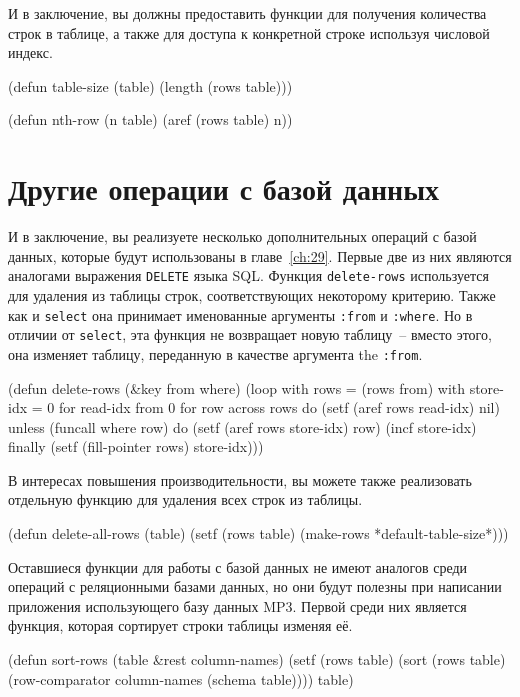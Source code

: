 И в заключение, вы должны предоставить функции для получения количества строк в таблице, а
также для доступа к конкретной строке используя числовой индекс.

\begin{myverb}
(defun table-size (table)
  (length (rows table)))

(defun nth-row (n table)
  (aref (rows table) n))
\end{myverb}

\section{Другие операции с базой данных}

И в заключение, вы реализуете несколько дополнительных операций с базой данных, которые
будут использованы в главе~\ref{ch:29}.  Первые две из них являются аналогами выражения
\lstinline{DELETE} языка SQL.  Функция \lstinline{delete-rows} используется для удаления из таблицы
строк, соответствующих некоторому критерию.  Также как и \lstinline{select} она принимает
именованные аргументы \lstinline{:from} и \lstinline{:where}.  Но в отличии от \lstinline{select}, эта
функция не возвращает новую таблицу~-- вместо этого, она изменяет таблицу, переданную в
качестве аргумента the \lstinline{:from}.

\begin{myverb}
(defun delete-rows (&key from where)
  (loop
     with rows = (rows from)
     with store-idx = 0
     for read-idx from 0
     for row across rows
     do (setf (aref rows read-idx) nil)
     unless (funcall where row) do
       (setf (aref rows store-idx) row)
       (incf store-idx)
     finally (setf (fill-pointer rows) store-idx)))
\end{myverb}

В интересах повышения производительности, вы можете также реализовать отдельную функцию
для удаления всех строк из таблицы.

\begin{myverb}
(defun delete-all-rows (table)
  (setf (rows table) (make-rows *default-table-size*)))
\end{myverb}

Оставшиеся функции для работы с базой данных не имеют аналогов среди операций с
реляционными базами данных, но они будут полезны при написании приложения использующего
базу данных MP3.  Первой среди них является функция, которая сортирует строки таблицы
изменяя её.

\begin{myverb}
(defun sort-rows (table &rest column-names)
  (setf (rows table) (sort (rows table) (row-comparator column-names (schema table))))
  table)
\end{myverb}

